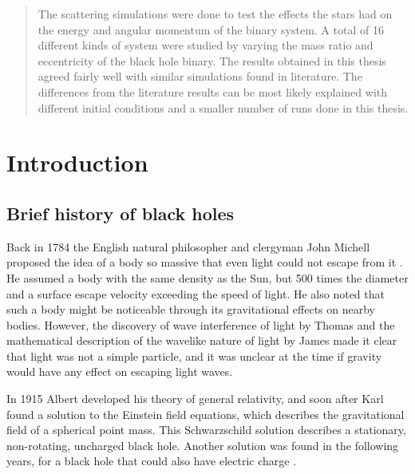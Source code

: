\documentclass[english, oneside]{HYgradu}
\begin{document}
\begin{abstract}
The scattering simulations were done to test the effects the stars had on the energy and angular momentum of the binary system. A total of 16 different kinds of system were studied by varying the mass ratio and eccentricity of the black hole binary. The results obtained in this thesis agreed fairly well with similar simulations found in literature. The differences from the literature results can be most likely explained with different initial conditions and a smaller number of runs done in this thesis.
\end{abstract}

\mytableofcontents


\setlength{\parindent}{.75cm}
\setlength{\parskip}{.6cm}
\chapter{Introduction}


\section{Brief history of black holes}

Back in 1784 the English natural philosopher and clergyman John Michell proposed the idea of a body so massive that even light could not escape from it \citep{michell:1784}. He assumed a body with the same density as the Sun, but 500 times the diameter and a surface escape velocity exceeding the speed of light. He also noted that such a body might be noticeable through its gravitational effects on nearby bodies. However, the discovery of wave interference of light by Thomas \cite{young:1804} and the mathematical description of the wavelike nature of light by James \cite{maxwell} made it clear that light was not a simple particle, and it was unclear at the time if gravity would have any effect on escaping light waves.

In 1915 Albert \citeauthor{einstein:1915} developed his theory of general relativity, and soon after Karl \cite{schwarzschild:1916} found a solution to the Einstein field equations, which describes the gravitational field of a spherical point mass. This Schwarzschild solution describes a stationary, non-rotating, uncharged black hole. Another solution was found in the following years, for a black hole that could also have electric charge \citep{reissner:1916, nordstrom:1918}.
\end{document}
